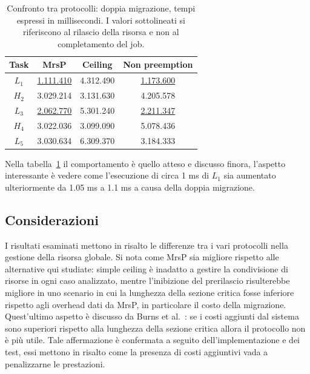   \begin{table}
  \centering
  \begin{tabular}{cccc}
  \hline\hline
    Task & MrsP & Ceiling & Non preemption \\ \hline
    $L_1$ & \underline{1.111.410} & 4.312.490 & \underline{1.173.600} \\
    $H_2$ & 3.029.214 & 3.131.630 & 4.205.578 \\
    $L_3$ & \underline{2.062.770} & 5.301.240 & \underline{2.211.347} \\
    $H_4$ & 3.022.036 & 3.099.090 & 5.078.436 \\
    $L_5$ & 3.030.634 & 6.309.370 & 3.184.333 \\
    \hline
    \end{tabular}
    \caption{Confronto tra protocolli: doppia migrazione, tempi espressi in millisecondi. I valori sottolineati si riferiscono al rilascio della risorsa e non al completamento del job.}
  \label{tab:test_protocols_Taskset4_ris}
  \end{table}

Nella tabella~\ref{tab:test_protocols_Taskset4_ris} il comportamento è quello atteso e discusso finora, l'aspetto interessante è vedere come l'esecuzione di circa 1 ms di $L_1$ sia aumentato ulteriormente da 1.05 ms a 1.1 ms a causa della doppia migrazione.

\subsection{Considerazioni}
\label{sec:confronto_protocolli_cons}

I risultati esaminati mettono in risalto le differenze tra i vari protocolli nella gestione della risorsa globale. Si nota come MrsP sia migliore rispetto alle alternative qui studiate: simple ceiling è inadatto a gestire la condivisione di risorse in ogni caso analizzato, mentre l'inibizione del prerilascio risulterebbe migliore in uno scenario in cui la lunghezza della sezione critica fosse inferiore rispetto agli overhead dati da MrsP, in particolare il costo della migrazione.\\

Quest'ultimo aspetto è discusso da Burns et al.~\cite{Burns:2013:SCM:2547348.2547350}: se i costi aggiunti dal sistema sono superiori rispetto alla lunghezza della sezione critica allora il protocollo non è più utile. Tale affermazione è confermata a seguito dell'implementazione e dei test, essi mettono in risalto come la presenza di costi aggiuntivi vada a penalizzarne le prestazioni.\\

